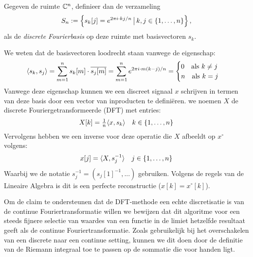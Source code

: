 \begin{definitie} Gegeven de ruimte $\mathbb{C}^n$, definieer dan de verzameling
\[
  S_n := \left\{ s_k [j] = e^{{2\pi i}\cdot k j/n } \,\big|\, k,j \in \{1, \ldots, n\} \right\},
\]
als de \emph{discrete Fourierbasis} op deze ruimte met basisvectoren $s_k$.
\end{definitie}
We weten dat de basisvectoren loodrecht staan vanwege de eigenschap:
\[
  \langle s_k , s_j \rangle = 
  \sum_{m=1}^n s_k[m]\cdot \overline{s_j[m]} = 
  \sum_{m=1}^n e^{{2\pi i}\cdot m (k-j)/n} =
  \begin{cases}
    0 \quad \text{als } k\neq j\\
    n \quad \text{als } k = j
  \end{cases}
\]
Vanwege deze eigenschap kunnen we een discreet signaal $x$ schrijven in termen van deze basis door 
een vector van inproducten te defini\"eren.
we noemen $X$ de discrete Fouriergetransformeerde (DFT) met entries:
\[
  X[k] = \tfrac{1}{n} \langle x , s_k \rangle \quad k\in\{1, \ldots ,n\}
\]
Vervolgens hebben we een inverse voor deze operatie die $X$ afbeeldt op $x^\circ$ volgens:
\[
  x[j] = \langle X , s_j^{-1} \rangle \quad j\in \{1, \ldots, n\}
\]
Waarbij we de notatie $s_j^{-1} = (s_j[1]^{-1},...)$ gebruiken.
Volgens de regels van de Lineaire Algebra is dit is een perfecte reconstructie ($x[k] = x^\circ[k]$).

Om de claim te ondersteunen dat de DFT-methode een echte discretisatie is van de continue Fouriertransformatie 
willen we bewijzen dat dit algoritme voor een steeds fijnere selectie van waardes van een functie in de 
limiet hetzelfde resultaat geeft als de continue Fouriertransformatie. 
Zoals gebruikelijk bij het overschakelen van een discrete naar een continue setting, kunnen we dit doen 
door de definitie van de Riemann integraal toe te passen op de sommatie die voor handen ligt.

